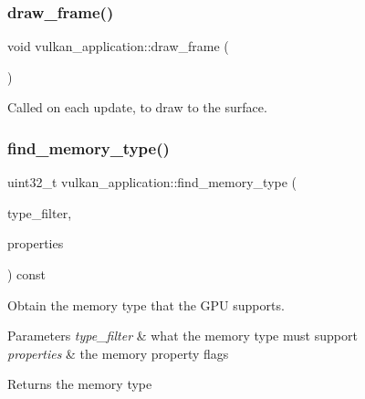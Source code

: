 \subsubsection{\texorpdfstring{draw\+\_\+frame()}{draw\_frame()}}
{\footnotesize\ttfamily void vulkan\+\_\+application\+::draw\+\_\+frame (\begin{DoxyParamCaption}{ }\end{DoxyParamCaption})\hspace{0.3cm}{\ttfamily [private]}}



Called on each update, to draw to the surface. 

\mbox{\label{classvulkan__application_ac5cbbeac91acbaad41d204567e6729ab}} 
\subsubsection{\texorpdfstring{find\+\_\+memory\+\_\+type()}{find\_memory\_type()}}
{\footnotesize\ttfamily uint32\+\_\+t vulkan\+\_\+application\+::find\+\_\+memory\+\_\+type (\begin{DoxyParamCaption}\item[{const uint32\+\_\+t}]{type\+\_\+filter,  }\item[{const Vk\+Memory\+Property\+Flags}]{properties }\end{DoxyParamCaption}) const\hspace{0.3cm}{\ttfamily [private]}}



Obtain the memory type that the G\+PU supports. 


\begin{DoxyParams}{Parameters}
{\em type\+\_\+filter} & what the memory type must support \\
\hline
{\em properties} & the memory property flags \\
\hline
\end{DoxyParams}
\begin{DoxyReturn}{Returns}
the memory type 
\end{DoxyReturn}
\mbox{\label{classvulkan__application_abbba891d35788327d9fa1b28c90fbd0e}} 
